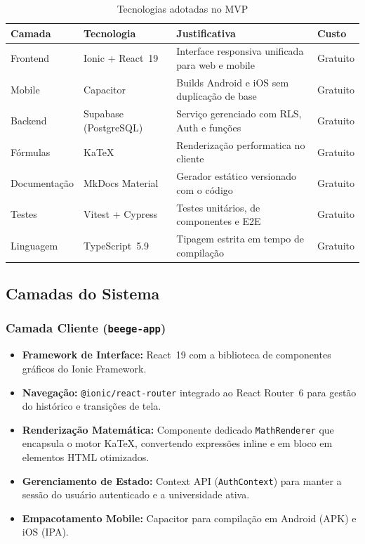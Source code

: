 \documentclass[12pt, a4paper]{article}
\begin{document}
\begin{table}[H]
\centering
\caption{Tecnologias adotadas no MVP}
\begin{tabularx}{\textwidth}{l l X l}
\toprule
\textbf{Camada} & \textbf{Tecnologia} & \textbf{Justificativa} & \textbf{Custo} \\
\midrule
Frontend & Ionic + React~19 & Interface responsiva unificada para web e mobile & Gratuito \\
Mobile & Capacitor & Builds Android e iOS sem duplica\c{c}\~{a}o de base & Gratuito \\
Backend & Supabase (PostgreSQL) & Servi\c{c}o gerenciado com RLS, Auth e fun\c{c}\~{o}es & Gratuito \\
F\'{o}rmulas & KaTeX & Renderiza\c{c}\~{a}o performatica no cliente & Gratuito \\
Documenta\c{c}\~{a}o & MkDocs Material & Gerador est\'{a}tico versionado com o c\'{o}digo & Gratuito \\
Testes & Vitest + Cypress & Testes unit\'{a}rios, de componentes e E2E & Gratuito \\
Linguagem & TypeScript~5.9 & Tipagem estrita em tempo de compila\c{c}\~{a}o & Gratuito \\
\bottomrule
\end{tabularx}
\end{table}

\subsection{Camadas do Sistema}

\subsubsection{Camada Cliente (\texttt{beege-app})}

\begin{itemize}[leftmargin=2cm]
  \item \textbf{Framework de Interface:} React~19 com a biblioteca de componentes gr\'{a}ficos do Ionic Framework.
  \item \textbf{Navega\c{c}\~{a}o:} \texttt{@ionic/react-router} integrado ao React Router~6 para gest\~{a}o do hist\'{o}rico e transi\c{c}\~{o}es de tela.
  \item \textbf{Renderiza\c{c}\~{a}o Matem\'{a}tica:} Componente dedicado \texttt{MathRenderer} que encapsula o motor KaTeX, convertendo express\~{o}es inline e em bloco em elementos HTML otimizados.
  \item \textbf{Gerenciamento de Estado:} Context API (\texttt{AuthContext}) para manter a sess\~{a}o do usu\'{a}rio autenticado e a universidade ativa.
  \item \textbf{Empacotamento Mobile:} Capacitor para compila\c{c}\~{a}o em Android (APK) e iOS (IPA).
\end{itemize}
\end{document}
